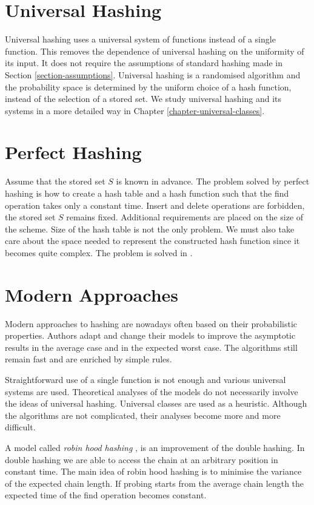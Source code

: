 \section{Universal Hashing}
Universal hashing uses a universal system of functions instead of a single function. This removes the dependence of universal hashing on the uniformity of its input. It does not require the assumptions of standard hashing made in Section \ref{section-assumptions}. Universal hashing is a randomised algorithm and the probability space is determined by the uniform choice of a hash function, instead of the selection of a stored set. We study universal hashing and its systems in a more detailed way in Chapter \ref{chapter-universal-classes}.

\section{Perfect Hashing}
Assume that the stored set $S$ is known in advance. The problem solved by perfect hashing is how to create a hash table and a hash function such that the find operation takes only a constant time. Insert and delete operations are forbidden, the stored set $S$ remains fixed. Additional requirements are placed on the size of the scheme. Size of the hash table is not the only problem. We must also take care about the space needed to represent the constructed hash function since it becomes quite complex. The problem is solved in \cite{1884}.

\section{Modern Approaches}
\label{section-modern-approaches}
Modern approaches to hashing are nowadays often based on their probabilistic properties. Authors adapt and change their models to improve the asymptotic results in the average case and in the expected worst case. The algorithms still remain fast and are enriched by simple rules. 

Straightforward use of a single function is not enough and various universal systems are used. Theoretical analyses of the models do not necessarily involve the ideas of universal hashing. Universal classes are used as a heuristic. Although the algorithms are not complicated, their analyses become more and more difficult.

A model called \emph{robin hood hashing} \cite{10.1109/SFCS.1985.48}, \cite{Devroye04onworst} is an improvement of the double hashing. In double hashing we are able to access the chain at an arbitrary position in constant time. The main idea of robin hood hashing is to minimise the variance of the expected chain length. If probing starts from the average chain length the expected time of the find operation becomes constant.

